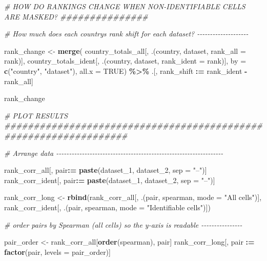 \documentclass[
  11pt,
]{article}
\newenvironment{Shaded}{\begin{snugshade}}{\end{snugshade}}
\newcommand{\AttributeTok}[1]{\textcolor[rgb]{0.13,0.29,0.53}{#1}}
\newcommand{\CommentTok}[1]{\textcolor[rgb]{0.56,0.35,0.01}{\textit{#1}}}
\newcommand{\ConstantTok}[1]{\textcolor[rgb]{0.56,0.35,0.01}{#1}}
\newcommand{\FunctionTok}[1]{\textcolor[rgb]{0.13,0.29,0.53}{\textbf{#1}}}
\newcommand{\NormalTok}[1]{#1}
\newcommand{\OtherTok}[1]{\textcolor[rgb]{0.56,0.35,0.01}{#1}}
\newcommand{\SpecialCharTok}[1]{\textcolor[rgb]{0.81,0.36,0.00}{\textbf{#1}}}
\newcommand{\StringTok}[1]{\textcolor[rgb]{0.31,0.60,0.02}{#1}}
\begin{document}
\begin{Shaded}
\begin{Highlighting}[]
\CommentTok{\# HOW DO RANKINGS CHANGE WHEN NON{-}IDENTIFIABLE CELLS ARE MASKED? \#\#\#\#\#\#\#\#\#\#\#\#\#\#\#}

\CommentTok{\# How much does each country\textquotesingle{}s rank shift for each dataset? {-}{-}{-}{-}{-}{-}{-}{-}{-}{-}{-}{-}{-}{-}{-}{-}{-}{-}{-}{-}}

\NormalTok{rank\_change }\OtherTok{\textless{}{-}} \FunctionTok{merge}\NormalTok{(}
\NormalTok{  country\_totals\_all[, .(country, dataset, }\AttributeTok{rank\_all =}\NormalTok{ rank)],}
\NormalTok{  country\_totals\_ident[, .(country, dataset, }\AttributeTok{rank\_ident =}\NormalTok{ rank)],}
  \AttributeTok{by =} \FunctionTok{c}\NormalTok{(}\StringTok{"country"}\NormalTok{, }\StringTok{"dataset"}\NormalTok{),}
  \AttributeTok{all.x =} \ConstantTok{TRUE}\NormalTok{) }\SpecialCharTok{\%\textgreater{}\%}
\NormalTok{  .[, rank\_shift }\SpecialCharTok{:=}\NormalTok{ rank\_ident }\SpecialCharTok{{-}}\NormalTok{ rank\_all]}

\NormalTok{rank\_change}

\CommentTok{\# PLOT RESULTS \#\#\#\#\#\#\#\#\#\#\#\#\#\#\#\#\#\#\#\#\#\#\#\#\#\#\#\#\#\#\#\#\#\#\#\#\#\#\#\#\#\#\#\#\#\#\#\#\#\#\#\#\#\#\#\#\#\#\#\#\#\#\#\#\#}

\CommentTok{\# Arrange data {-}{-}{-}{-}{-}{-}{-}{-}{-}{-}{-}{-}{-}{-}{-}{-}{-}{-}{-}{-}{-}{-}{-}{-}{-}{-}{-}{-}{-}{-}{-}{-}{-}{-}{-}{-}{-}{-}{-}{-}{-}{-}{-}{-}{-}{-}{-}{-}{-}{-}{-}{-}{-}{-}{-}{-}{-}{-}{-}{-}{-}{-}{-}{-}{-}}

\NormalTok{rank\_corr\_all[, pair}\SpecialCharTok{:=} \FunctionTok{paste}\NormalTok{(dataset\_1, dataset\_2, }\AttributeTok{sep =} \StringTok{"–"}\NormalTok{)]}
\NormalTok{rank\_corr\_ident[, pair}\SpecialCharTok{:=} \FunctionTok{paste}\NormalTok{(dataset\_1, dataset\_2, }\AttributeTok{sep =} \StringTok{"–"}\NormalTok{)]}

\NormalTok{rank\_corr\_long }\OtherTok{\textless{}{-}} \FunctionTok{rbind}\NormalTok{(rank\_corr\_all[, .(pair, spearman, }\AttributeTok{mode =} \StringTok{"All cells"}\NormalTok{)],}
\NormalTok{                        rank\_corr\_ident[, .(pair, spearman, }\AttributeTok{mode =} \StringTok{"Identifiable cells"}\NormalTok{)])}

\CommentTok{\# order pairs by Spearman (all cells) so the y{-}axis is readable {-}{-}{-}{-}{-}{-}{-}{-}{-}{-}{-}{-}{-}{-}{-}{-}}

\NormalTok{pair\_order }\OtherTok{\textless{}{-}}\NormalTok{ rank\_corr\_all[}\FunctionTok{order}\NormalTok{(spearman), pair]}
\NormalTok{rank\_corr\_long[, pair }\SpecialCharTok{:=} \FunctionTok{factor}\NormalTok{(pair, }\AttributeTok{levels =}\NormalTok{ pair\_order)]}


\end{Highlighting}
\end{Shaded}
\end{document}
